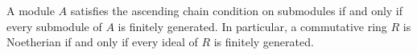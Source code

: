A module $A$ satisfies the ascending chain condition on submodules if and only if every submodule of $A$ is finitely generated. In particular, a commutative ring $R$ is Noetherian if and only if every ideal of $R$ is finitely generated.
